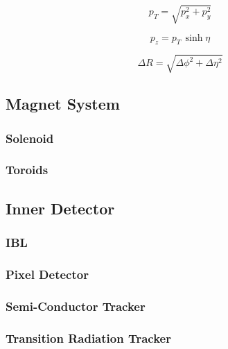 \begin{equation}
\label{eq:cern:pt}
p_T = \sqrt{p_x^2 + p_y^2}
\end{equation}

\begin{equation}
\label{eq:cern:pz}
p_z = p_T \,\sinh \eta
\end{equation}

\begin{equation}
\label{eq:cern:dR}
\Delta R = \sqrt{ \Delta \phi^2 + \Delta \eta^2  }
\end{equation}




\subsection{Magnet System}
\label{sec:cern:atlasmagnets}

\subsubsection*{Solenoid}

\subsubsection*{Toroids}



\subsection{Inner Detector}

\subsubsection*{IBL}

\subsubsection*{Pixel Detector}


\subsubsection*{Semi-Conductor Tracker}


\subsubsection*{Transition Radiation Tracker}



